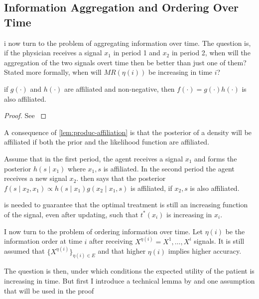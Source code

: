 \documentclass[10pt,a4paper]{article}
\begin{document}
\subsection{Information Aggregation and Ordering Over Time}
i now turn to the problem of aggregating information over time. The question is, if the physician receives a signal \(x_1\) in period 1 and \(x_2\) in period 2, when will the aggregation of the two signals overt time then be better than just one of them? Stated more formally, when will \(MR(\eta(i))\) be increasing in time \(i\)?

\begin{lemma}\label{lem:produc-affiliation}
	if \(g(\cdot)\) and \(h(\cdot)\) are affiliated and non-negative, then \(f(\cdot)=g(\cdot)h(\cdot)\) is also affiliated.
\end{lemma}
\begin{proof}
	See \textcite{Milgrom1982a}
\end{proof}
A consequence of \cref{lem:produc-affiliation} is that the posterior of a density will be affiliated if both the prior and the likelihood function are affiliated.

\begin{example}
 Assume that in the first period, the agent receives a signal \(x_1\) and forms the posterior \(h(s\mid x_1)\) where \(x_1,s\) is affiliated. In the second period the agent receives a new signal \(x_2\).  then says that the posterior \(f(s\mid x_2,x_1) \propto h(s\mid x_1)g(x_2\mid x_1,s)\) is affiliated, if \(x_2,s\) is also affiliated.
 \end{example}

 is needed to guarantee that the optimal treatment is still an increasing function of the signal, even after updating, such that \(t^*(x_i)\) is increasing in \(x_i\).

I now turn to the problem of ordering information over time. Let \(\eta(i)\) be the information order at time \(i\) after receiving \({X}^{\eta(i)}=X^{1},\ldots,X^{i}\) signals. It is still assumed that \(\{{X}^{\eta(i)}\}_{\eta(i)\in E}\) and that higher \(\eta(i)\) implies higher accuracy.

The question is then, under which conditions the expected utility of the patient is increasing in time. But first I introduce a technical lemma by \textcite{Persico1996} and one assumption that will be used in the proof
\end{document}
